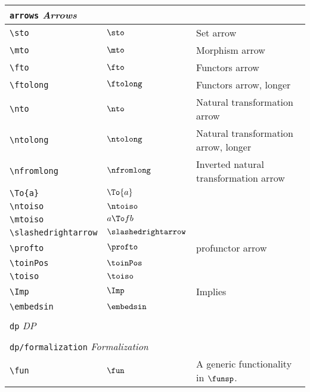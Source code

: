 \begin{longtable}{lll}
 \multicolumn{3}{l}{{\color[rgb]{0.5,0.5,0.5}\texttt{arrows}} \emph{Arrows}}\\ 
 \hline
\hline
{\color[rgb]{0.5,0.5,0.5}\texttt{\textbackslash sto}} & $\sto$ &  Set arrow\\ 
 {\color[rgb]{0.5,0.5,0.5}\texttt{\textbackslash mto}} & $\mto$ &  Morphism arrow\\ 
 {\color[rgb]{0.5,0.5,0.5}\texttt{\textbackslash fto}} & $\fto$ &  Functors arrow\\ 
 {\color[rgb]{0.5,0.5,0.5}\texttt{\textbackslash ftolong}} & $\ftolong$ &  Functors arrow, longer\\ 
 {\color[rgb]{0.5,0.5,0.5}\texttt{\textbackslash nto}} & $\nto$ &  Natural transformation arrow\\ 
 {\color[rgb]{0.5,0.5,0.5}\texttt{\textbackslash ntolong}} & $\ntolong$ &  Natural transformation arrow, longer\\ 
 {\color[rgb]{0.5,0.5,0.5}\texttt{\textbackslash nfromlong}} & $\nfromlong$ &  Inverted natural transformation arrow\\ 
 {\color[rgb]{0.5,0.5,0.5}\texttt{\textbackslash To\{a\}}} & $\To{a}$ & \\ 
 {\color[rgb]{0.5,0.5,0.5}\texttt{\textbackslash ntoiso}} & $\ntoiso$ & \\ 
 {\color[rgb]{0.5,0.5,0.5}\texttt{\textbackslash mtoiso}} & $a \To f b$ & \\ 
 {\color[rgb]{0.5,0.5,0.5}\texttt{\textbackslash slashedrightarrow}} & $\slashedrightarrow$ & \\ 
 {\color[rgb]{0.5,0.5,0.5}\texttt{\textbackslash profto}} & $\profto$ &  profunctor arrow\\ 
 {\color[rgb]{0.5,0.5,0.5}\texttt{\textbackslash toinPos}} & $\toinPos$ & \\ 
 {\color[rgb]{0.5,0.5,0.5}\texttt{\textbackslash toiso}} & $\toiso$ & \\ 
 {\color[rgb]{0.5,0.5,0.5}\texttt{\textbackslash Imp}} & $\Imp$ &  Implies\\ 
 {\color[rgb]{0.5,0.5,0.5}\texttt{\textbackslash embedsin}} & $\embedsin$ & \\ 
  &  & \\ 
 \multicolumn{3}{l}{{\color[rgb]{0.5,0.5,0.5}\texttt{dp}} \emph{DP}}\\ 
 \hline
\hline
 &  & \\ 
 \multicolumn{3}{l}{{\color[rgb]{0.5,0.5,0.5}\texttt{dp/formalization}} \emph{Formalization}}\\ 
 \hline
{\color[rgb]{0.5,0.5,0.5}\texttt{\textbackslash fun}} & $\fun$ &  A generic functionality in $\funsp$.\\ 

\end{longtable}
